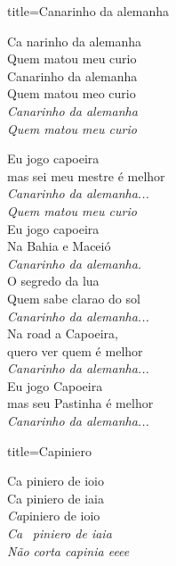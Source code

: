 \documentclass[fontsize=14pt, twoside]{scrreprt}
\begin{document}
\begin{multicols*}{2}
\begin{song}{title={Canarinho da alemanha}}
    \begin{chorus*}
            Ca narinho da alemanha\\
            Quem matou meu curio\\
            Canarinho da alemanha\\
            Quem matou meo curio\\
            \textit{Canarinho da alemanha}\\
            \textit{Quem matou meu curio}
    \end{chorus*}
        \begin{verse*}
            Eu jogo capoeira\\
            mas sei meu mestre é melhor\\
            \textit{Canarinho da alemanha...}\\
            \textit{Quem matou meu curio}\\
            Eu jogo capoeira\\
            Na Bahia e Maceió\\
            \textit{Canarinho da alemanha.}\\
            O segredo da lua\\
            Quem sabe clarao do sol\\
            \textit{Canarinho da alemanha...}\\
            Na road a Capoeira,\\
            quero ver quem é melhor\\
            \textit{Canarinho da alemanha...}\\
            Eu jogo Capoeira\\
            mas seu Pastinha é melhor\\
            \textit{Canarinho da alemanha...}\\
        \end{verse*}
\end{song}
\columnbreak
\begin{song}{title={Capiniero}}
        \begin{verse*}
            Ca piniero de ioio\\
            Ca piniero de iaia\\
            \textit{Ca}piniero de ioio\\
            \textit{Ca} \ \textit{piniero de iaia}\\
            \textit{Não}  \textit{corta capinia eee}\textit{e} \\

\end{verse*}
\end{song}
\end{multicols*}
\end{document}
